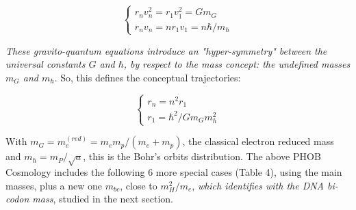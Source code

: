 \documentclass[a4paper,9pt]{article}
\newcounter{row}
\begin{document}
 \begin{equation}\label{Eq11}
 \left\{
    \begin{array}{ll}
        r_nv_n^2 = r_1v_1^2 = Gm_G \\
        r_nv_n = nr_1v_1 = n \hbar/m_{\hbar}
    \end{array}
\right.
\end{equation}

\textit{These gravito-quantum equations introduce an "hyper-symmetry" between the universal constants $G$ and $\hbar$, by respect to the mass concept: the undefined masses $m_G$ and $m_{\hbar}$}. So, this defines the conceptual trajectories:

\begin{equation}\label{Eq12}
 \left\{
    \begin{array}{ll}
        r_n = n^2 r_1 \\
        
        r_1 = \hbar^2/Gm_Gm_{\hbar}^2   
    \end{array}
\right.
\end{equation}

With $m_G = m_e^{(red)} = m_em_p/(m_e+m_p)$, the classical electron reduced mass and $m_{\hbar} = m_P/\sqrt a$, this is the Bohr's orbits distribution. The above PHOB Cosmology includes the following 6 more special cases (Table 4), using the main masses, plus a new one $m_{bc}$, close to $m_H^2/m_e$, \textit{which identifies with the DNA bi-codon mass}, studied in the next section.

    
    
        
        
        
         
\end{document}
